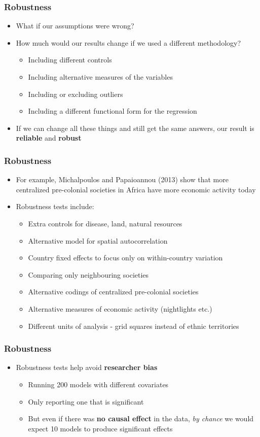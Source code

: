 \documentclass[xcolor=x11names,compress]{beamer}\usepackage[]{graphicx}\usepackage[]{color}
\renewcommand{\(}{\begin{columns}}
\renewcommand{\)}{\end{columns}}
\newcommand{\<}[1]{\begin{column}{#1}}
\renewcommand{\>}{\end{column}}
\begin{document}
\begin{frame}
\frametitle{Robustness}
\begin{itemize}
\item What if our assumptions were wrong?
\pause
\item How much would our results change if we used a different methodology?
\pause
\begin{itemize}
\item Including different controls
\pause
\item Including alternative measures of the variables
\pause
\item Including or excluding outliers
\pause
\item Including a different functional form for the regression
\pause
\end{itemize}
\item If we can change all these things and still get the same answers, our result is \textbf{reliable} and \textbf{robust}
\end{itemize}
\end{frame}

\begin{frame}
\frametitle{Robustness}
\begin{itemize}
\item For example, Michalpoulos and Papaioannou (2013) show that more centralized pre-colonial societies in Africa have more economic activity today
\pause
\item Robustness tests include:
\begin{itemize}
\item Extra controls for disease, land, natural resources
\item Alternative model for spatial autocorrelation
\item Country fixed effects to focus only on within-country variation
\item Comparing only neighbouring societies
\item Alternative codings of centralized pre-colonial societies
\item Alternative measures of economic activity (nightlights etc.)
\item Different units of analysis - grid squares instead of ethnic territories
\end{itemize}
\end{itemize}
\end{frame}

\begin{frame}
\frametitle{Robustness}
\begin{itemize}
\item Robustness tests help avoid \textbf{researcher bias}
\pause
\begin{itemize}
\item Running 200 models with different covariates
\pause
\item Only reporting one that is significant
\pause
\item But even if there was \textbf{no causal effect} in the data, \textit{by chance} we would expect 10 models to produce significant effects
\end{itemize}
\end{itemize}
\end{frame}
\end{document}
